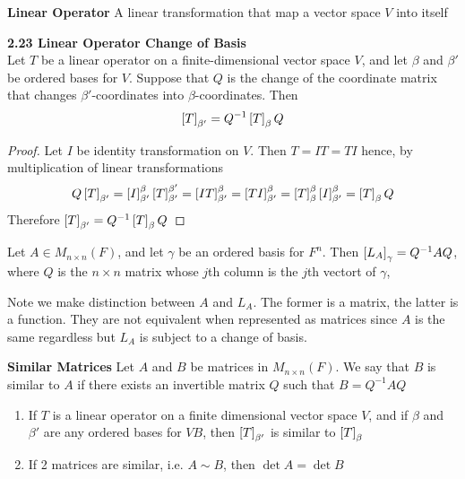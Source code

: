 \documentclass[11pt]{article}
\begin{document}
\begin{defn*}
    \textbf{Linear Operator} A linear transformation that map a vector space $V$ into itself
\end{defn*}

\begin{theorem*}
    \textbf{2.23 Linear Operator Change of Basis} \\
    Let $T$ be a linear operator on a finite-dimensional vector space $V$, and let $\beta$ and $\beta'$ be ordered bases for $V$. Suppose that $Q$ is the change of the coordinate matrix that changes $\beta'$-coordinates into $\beta$-coordinates. Then 
    \[
        \left[ T \right]_{\beta'} = Q^{-1}\left[ T \right]_{\beta}Q    
    \]
    \begin{proof}
        Let $I$ be identity transformation on $V$. Then $T=IT=TI$ hence, by multiplication of linear transformations
        \[
            Q\left[ T \right]_{\beta'} = \left[ I \right]_{\beta'}^{\beta}\left[ T \right]_{\beta'}^{\beta'}
             = \left[ IT \right]_{\beta'}^{\beta} = \left[ TI \right]_{\beta'}^{\beta} 
             = \left[ T \right]_{\beta}^{\beta} \left[ I \right]_{\beta'}^{\beta} = \left[ T \right]_{\beta} Q
        \]
        Therefore $\left[ T \right]_{\beta'} = Q^{-1} \left[ T \right]_{\beta} Q$
    \end{proof}
\end{theorem*}

\begin{corollary*}
    Let $A\in M_{n\times n}(F)$, and let $\gamma$ be an ordered basis for $F^n$. Then $\left[ L_A \right]_{\gamma} = Q^{-1}AQ$, where $Q$ is the $n\times n$ matrix whose $j$th column is the $j$th vectort of $\gamma$, 
    \begin{rem}
        Note we make distinction between $A$ and $L_A$. The former is a matrix, the latter is a function. They are not equivalent when represented as matrices since $A$ is the same regardless but $L_A$ is subject to a change of basis. 
    \end{rem}    
\end{corollary*}

\begin{defn*}
    \textbf{Similar Matrices} Let $A$ and $B$ be matrices in $M_{n\times n}(F)$. We say that $B$ is similar to $A$ if there exists an invertible matrix $Q$ such that $B = Q^{-1}AQ$
    \begin{enumerate}
        \item If $T$ is a linear operator on a finite dimensional vector space $V$, and if $\beta$ and $\beta'$ are any ordered bases for $VB$, then $\left[ T \right]_{\beta'}$ is similar to $\left[ T \right]_{\beta}$
        \item If 2 matrices are similar, i.e. $A\sim B$, then $\det{A} = \det{B}$
    \end{enumerate}
\end{defn*}
\end{document}
